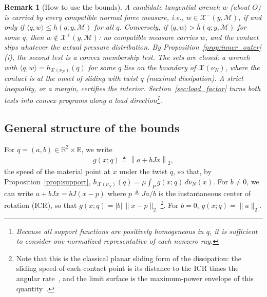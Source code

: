 \documentclass[11pt,a4paper]{article}
\theoremstyle{plain}
\newtheorem{remark}[theorem]{Remark}
\newcommand{\R}{\mathbb{R}}
\newcommand{\X}{\mathcal X}
\begin{document}
\begin{remark}[How to use the bounds]
    \label{rem:use_bounds}
    A candidate tangential wrench $w$ (about $O$) is carried by every compatible normal force measure, i.e., $w\in\X^-(y,\mathcal M)$, if and only if
    $\langle q,w\rangle\le\underline h(q;y,\mathcal M)$ for all $q$. Conversely, if $\langle q,w\rangle>\overline h(q;y,\mathcal M)$ for some $q$, then $w\notin\X^+(y,\mathcal M)$: no compatible
    measure carries $w$, and the contact slips whatever the actual pressure distribution. By Proposition~\ref{prop:inner_outer}(i), the second test is a convex membership test.
    The sets are closed: a wrench with $\langle q,w\rangle=h_{\X(\nu_N)}(q)$ for some $q$ lies on the boundary of $\X(\nu_N)$, where the contact is at the
    onset of sliding with twist $q$ (maximal dissipation). A strict inequality, or a margin, certifies the interior.
    Section~\ref{sec:load_factor} turns both tests into convex programs along a load direction\footnote{Because all support functions are positively homogeneous in $q$, it is sufficient
    to consider one normalized representative of each nonzero ray.}.
\end{remark}

\subsection{General structure of the bounds}
\label{sec:general_structure}

For $q=(a,b)\in\R^2\times\R$, we write
\begin{align}
    \label{eq:def_g}
    g(x;q)\triangleq\left\|a+bJx\right\|_2,
\end{align}
the speed of the material point at $x$ under the twist $q$, so that, by Proposition~\ref{prop:support},
$h_{\X(\nu_N)}(q)=\mu\int_P g(x;q)\,d\nu_N(x)$.
For $b\neq0$, we can write $a+bJx=bJ(x-p)$ where $p\triangleq Ja/b$ is the instantaneous center of rotation (ICR), so that $g(x;q)=|b|\,\|x-p\|_2$
\footnote{Note that this is the classical planar sliding form of the dissipation: the sliding speed of each contact point is its distance to the ICR times the angular rate~\cite[Eq.~7]{alexander1993bounds}, 
and the limit surface is the maximum-power envelope of this quantity~\cite[§8]{goyal1991planar}.}. For $b=0$, $g(x;q)=\|a\|_2$.
\end{document}
